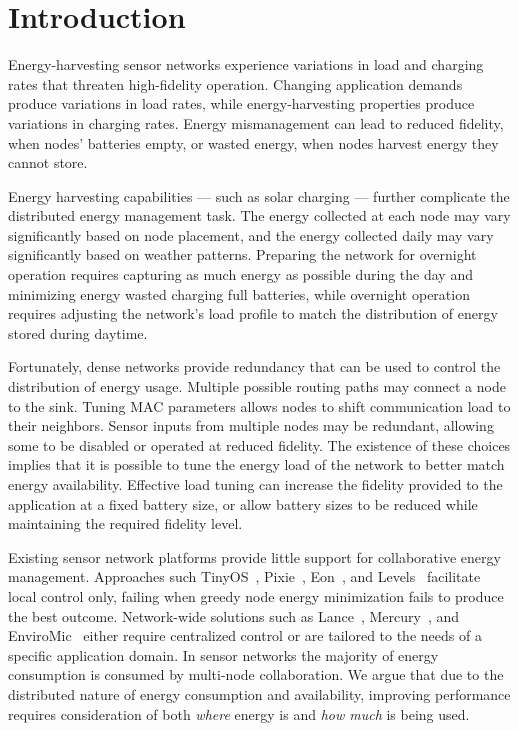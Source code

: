 \documentclass{sig-alternate}
\begin{document}
\section{Introduction}
\label{sec-introduction}

Energy-harvesting sensor networks experience variations in load and charging
rates that threaten high-fidelity operation. Changing application demands
produce variations in load rates, while energy-harvesting properties
produce variations in charging rates. Energy mismanagement can lead to
reduced fidelity, when nodes' batteries empty, or wasted energy, when nodes
harvest energy they cannot store.

Energy harvesting capabilities --- such as solar charging --- further
complicate the distributed energy management task. The energy collected at
each node may vary significantly based on node placement, and the energy
collected daily may vary significantly based on weather patterns.  Preparing
the network for overnight operation requires capturing as much energy as
possible during the day and minimizing energy wasted charging full batteries,
while overnight operation requires adjusting the network's load profile to
match the distribution of energy stored during daytime.

Fortunately, dense networks provide redundancy that can be used to control
the distribution of energy usage. Multiple possible routing paths may connect
a node to the sink. Tuning MAC parameters allows nodes to shift communication
load to their neighbors. Sensor inputs from multiple nodes may be redundant,
allowing some to be disabled or operated at reduced fidelity.  The existence
of these choices implies that it is possible to tune the energy load of the
network to better match energy availability. Effective load tuning can
increase the fidelity provided to the application at a fixed battery size, or
allow battery sizes to be reduced while maintaining the required fidelity
level.
\vfill\eject

Existing sensor network platforms provide little support for collaborative
energy management. Approaches such TinyOS~\cite{tinyos-asplos00},
Pixie~\cite{pixie-sensys08}, Eon~\cite{eon-sensys07}, and
Levels~\cite{levels-sensys07} facilitate local control only, failing when
greedy node energy minimization fails to produce the best outcome.
Network-wide solutions such as Lance~\cite{lance-sensys08},
Mercury~\cite{parkinsons-embs07}, and EnviroMic~\cite{enviromic} either
require centralized control or are tailored to the needs of a specific
application domain. In sensor networks the majority of energy consumption is
consumed by multi-node collaboration. We argue that due to the distributed
nature of energy consumption and availability, improving performance requires
consideration of both \textit{where} energy is and \textit{how much} is being
used.
\end{document}
